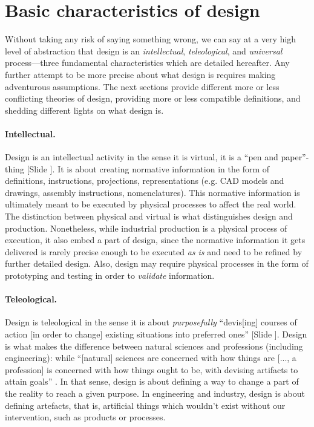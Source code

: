 \documentclass{article}
\newcounter{slide}
\begin{document}
\section{Basic characteristics of design}
\label{sec:whatisdesign}

Without taking any risk of saying something wrong, we can say at a very high level of abstraction that design is an \emph{intellectual}, \emph{teleological}, and \emph{universal} process---three fundamental characteristics which are detailed hereafter. Any further attempt to be more precise about what design is requires making adventurous assumptions. The next sections provide different more or less conflicting theories of design, providing more or less compatible definitions, and shedding different lights on what design is. 

\paragraph{Intellectual.} Design is an intellectual activity in the sense it is virtual, it is a ``pen and paper''-thing {\color{blue}[Slide ]}. It is about creating normative information in the form of definitions, instructions, projections, representations (e.g. CAD models and drawings, assembly instructions, nomenclatures). This normative information is ultimately meant to be executed by physical processes to affect the real world. The distinction between physical and virtual is what distinguishes design and production. Nonetheless, while industrial production is a physical process of execution, it also embed a part of design, since the normative information it gets delivered is rarely precise enough to be executed \emph{as is} and need to be refined by further detailed design. Also, design may require physical processes in the form of prototyping and testing in order to \emph{validate} information.

\paragraph{Teleological.} Design is teleological in the sense it is about \emph{purposefully} ``devis[ing] courses of action [in order to change] existing situations into preferred ones'' \cite[p. 111]{simon1996sciences} {\color{blue}[Slide ]}. Design is what makes the difference between natural sciences and professions (including engineering): while ``[natural] sciences are concerned with how things are [..., a profession] is concerned with how things ought to be, with devising artifacts to attain goals'' \cite[p. 114]{simon1996sciences}. In that sense, design is about defining a way to change a part of the reality to reach a given purpose. In engineering and industry, design is about defining artefacts, that is, artificial things which wouldn't exist without our intervention, such as products or processes. 
\end{document}
